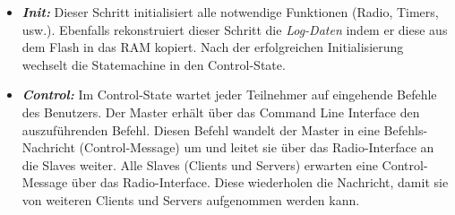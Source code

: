 \begin{itemize}
	\item \textbf{\textit{Init:}} Dieser Schritt initialisiert alle notwendige Funktionen (Radio, Timers, usw.). Ebenfalls rekonstruiert dieser Schritt die \textit{Log-Daten} indem er diese aus dem Flash in das RAM kopiert. Nach der erfolgreichen Initialisierung wechselt die Statemachine in den Control-State.
	\item \textbf{\textit{Control:}} Im Control-State wartet jeder Teilnehmer auf eingehende Befehle des Benutzers. Der Master erhält über das Command Line Interface den auszuführenden Befehl. Diesen Befehl wandelt der Master in eine Befehls-Nachricht (Control-Message) um und leitet sie über das Radio-Interface an die Slaves weiter.  Alle Slaves (Clients und Servers) erwarten eine Control-Message über das Radio-Interface. Diese wiederholen die Nachricht, damit sie von weiteren Clients und Servers aufgenommen werden kann.    
	

\end{itemize}
